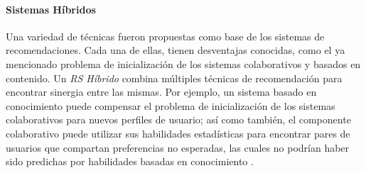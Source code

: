 \paragraph{Sistemas Híbridos}
Una variedad de técnicas fueron propuestas como base de los sistemas de recomendaciones. Cada una de ellas, tienen desventajas conocidas, como el ya mencionado problema de inicialización de los sistemas colaborativos y basados en contenido. Un \textit{RS Híbrido} combina múltiples técnicas de recomendación para encontrar sinergia entre las mismas. Por ejemplo, un sistema basado en conocimiento puede compensar el problema de inicialización de los sistemas colaborativos para nuevos perfiles de usuario; así como también, el componente colaborativo puede utilizar sus habilidades estadísticas para encontrar pares de usuarios que compartan preferencias no esperadas, las cuales no podrían haber sido predichas por habilidades basadas en conocimiento \citep{burke2007hybrid}.